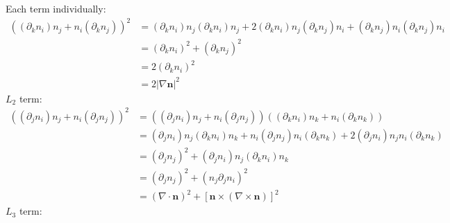 \documentclass[reqno]{article}
\begin{document}
Each term individually:
\begin{equation}
\begin{split}
    \left( (\partial_k n_i) n_j + n_i (\partial_k n_j) \right)^2
    &= (\partial_k n_i) n_j (\partial_k n_i) n_j
    + 2 (\partial_k n_i) n_j (\partial_k n_j) n_i
    + (\partial_k n_j) n_i (\partial_k n_j) n_i \\
    &= (\partial_k n_i)^2
    + (\partial_k n_j)^2 \\
    &= 2 (\partial_k n_i)^2 \\
    &= 2 \left| \nabla \mathbf{n} \right|^2
\end{split}
\end{equation}
$L_2$ term:
\begin{equation}
\begin{split}
    \left( (\partial_j n_i) n_j + n_i (\partial_j n_j) \right)^2
    &=
    \left( (\partial_j n_i) n_j + n_i (\partial_j n_j) \right)
    \left( (\partial_k n_i) n_k + n_i (\partial_k n_k) \right)\\
    &=
    (\partial_j n_i) n_j (\partial_k n_i) n_k
    + n_i (\partial_j n_j) n_i (\partial_k n_k)
    + 2 (\partial_j n_i) n_j n_i (\partial_k n_k) \\
    &=
    (\partial_j n_j)^2
    + (\partial_j n_i) n_j (\partial_k n_i) n_k \\
    &= 
    (\partial_j n_j)^2
    + (n_j \partial_j n_i)^2 \\
    &=
    (\nabla \cdot \mathbf{n})^2 + \left[ \mathbf{n} \times (\nabla \times \mathbf{n}) \right]^2
\end{split}
\end{equation}
$L_3$ term:
\end{document}
